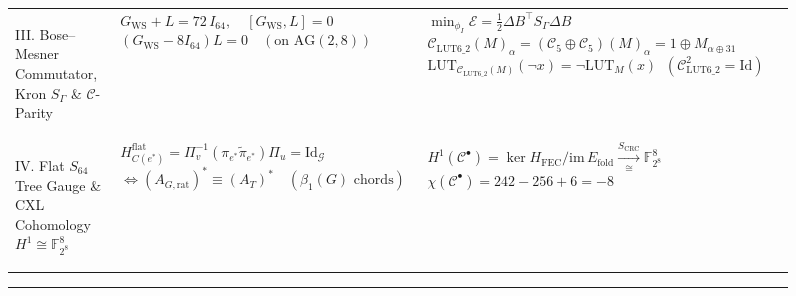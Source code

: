 \documentclass[11pt,letterpaper]{article}
\theoremstyle{spectralthm}
\begin{document}
\begin{figure}[!htp]
{{\begin{minipage}{\dimexpr\textwidth-2\fboxsep-2\fboxrule\relax}
{\begin{tabularx}{\linewidth}{@{} >{\bfseries\raggedright\arraybackslash}p{} >{\raggedright\arraybackslash}X >{\raggedright\arraybackslash}X @{}}
    III. Bose--Mesner Commutator, Kron $S_\Gamma$ \& $\mathcal{C}$-Parity &
      $G_{\mathrm{WS}}+L=72\,I_{64}, \quad [G_{\mathrm{WS}},L]=0$ \newline
      $(G_{\mathrm{WS}}-8I_{64})L=0 \quad (\text{on }\mathrm{AG}(2,8))$ &
      $\min_{\phi_I}\mathcal{E}=\tfrac{1}{2}\Delta B^\top S_\Gamma\Delta B$ \newline
      $\mathcal{C}_{\mathrm{LUT6\_2}}(M)_\alpha \allowbreak= (\mathcal{C}_5\oplus\mathcal{C}_5)(M)_\alpha \allowbreak= 1\oplus M_{\alpha\oplus 31}$ \newline
      $\mathrm{LUT}_{\mathcal{C}_{\mathrm{LUT6\_2}}(M)}(\neg x)=\neg\mathrm{LUT}_M(x)\;\;(\mathcal{C}_{\mathrm{LUT6\_2}}^2=\mathrm{Id})$ \\[5pt]
    IV. Flat $S_{64}$ Tree Gauge \& CXL Cohomology $H^1\cong\mathbb{F}_{2^8}^8$ &
      $H_{C(e^*)}^{\mathrm{flat}}=\Pi_v^{-1}(\pi_{e^*}\widetilde{\pi}_{e^*})\Pi_u=\mathrm{Id}_{\mathcal{G}}$ \newline
      $\iff (A_{G,\mathrm{rat}})^*\equiv(A_T)^* \quad (\beta_1(G)\text{ chords})$ &
      $H^1(\mathcal{C}^\bullet)=\ker H_{\mathrm{FEC}}/\mathrm{im}\,E_{\mathrm{fold}}\xrightarrow[\cong]{S_{\mathrm{CRC}}}\mathbb{F}_{2^8}^8$ \newline
      $\chi(\mathcal{C}^\bullet)=242-256+6=-8$
    \end{tabularx}}
    \vspace{7pt}\hrule height 0.6pt\vspace{6pt}
\end{minipage}}}
\end{figure}
\end{document}
